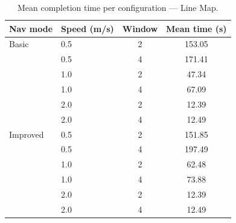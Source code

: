 \begin{table}
    \centering
    \begin{tabular}{llcc}
        \hline
        \textbf{Nav mode} & \textbf{Speed (m/s)} & \textbf{Window} & \textbf{Mean time (s)} \\
        \hline
        Basic             & 0.5                  & 2               & 153.05                 \\
                          & 0.5                  & 4               & 171.41                 \\
                          & 1.0                  & 2               & 47.34                  \\
                          & 1.0                  & 4               & 67.09                  \\
                          & 2.0                  & 2               & 12.39                  \\
                          & 2.0                  & 4               & 12.49                  \\
        Improved          & 0.5                  & 2               & 151.85                 \\
                          & 0.5                  & 4               & 197.49                 \\
                          & 1.0                  & 2               & 62.48                  \\
                          & 1.0                  & 4               & 73.88                  \\
                          & 2.0                  & 2               & 12.39                  \\
                          & 2.0                  & 4               & 12.49                  \\
        \hline
    \end{tabular}
    \caption{Mean completion time per configuration --- Line Map.}
    \label{tab:line_map}
\end{table}

